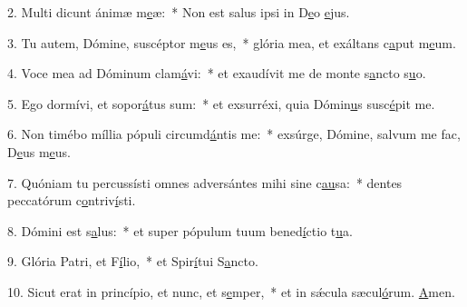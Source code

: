 2. Multi dicunt ánimæ m\uline{e}æ:~* Non est salus ipsi in D\uline{e}o \uline{e}jus.\par 
3. Tu autem, Dómine, suscéptor m\uline{e}us es,~* glória mea, et exáltans c\uline{a}put m\uline{e}um.\par 
4. Voce mea ad Dóminum clam\uline{á}vi:~* et exaudívit me de monte s\uline{a}ncto s\uline{u}o.\par 
5. Ego dormívi, et sopor\uline{á}tus sum:~* et exsurréxi, quia Dómin\uline{u}s susc\uline{é}pit me.\par 
6. Non timébo míllia pópuli circumd\uline{á}ntis me:~* exsúrge, Dómine, salvum me fac, D\uline{e}us m\uline{e}us.\par 
7. Quóniam tu percussísti omnes adversántes mihi sine c\uline{au}sa:~* dentes peccatórum c\uline{o}ntriv\uline{í}sti.\par 
8. Dómini est s\uline{a}lus:~* et super pópulum tuum bened\uline{í}ctio t\uline{u}a.\par 
9. Glória Patri, et F\uline{í}lio,~* et Spir\uline{í}tui S\uline{a}ncto.\par 
10. Sicut erat in princípio, et nunc, et s\uline{e}mper,~* et in sǽcula sæcul\uline{ó}rum. \uline{A}men.\par 
